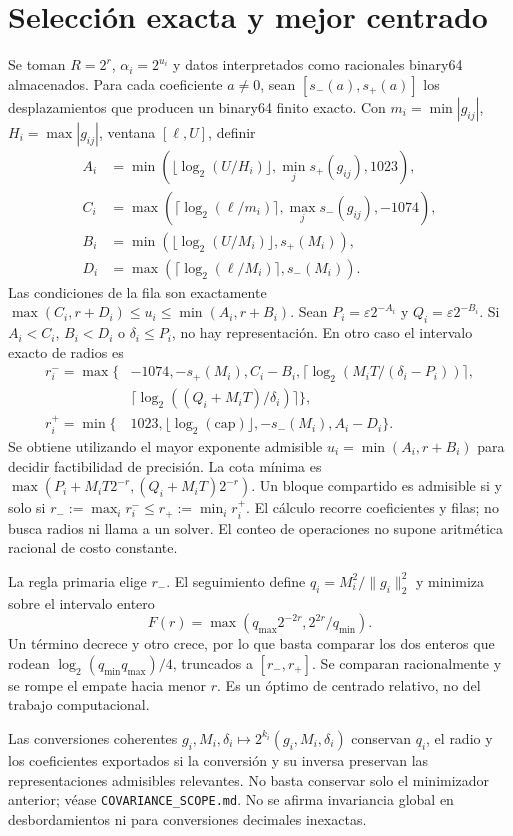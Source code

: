 \documentclass[10pt,a4paper]{article}
\begin{document}
\section{Selección exacta y mejor centrado}
Se toman $R=2^r$, $\alpha_i=2^{u_i}$ y datos interpretados como racionales
binary64 almacenados. Para cada coeficiente $a\ne0$, sean
$[s_-(a),s_+(a)]$ los desplazamientos que producen un binary64 finito exacto.
Con $m_i=\min|g_{ij}|$, $H_i=\max|g_{ij}|$, ventana $[\ell,U]$, definir
\begin{align*}
A_i&=\min(\lfloor\log_2(U/H_i)\rfloor,\min_j s_+(g_{ij}),1023),\\
C_i&=\max(\lceil\log_2(\ell/m_i)\rceil,\max_j s_-(g_{ij}),-1074),\\
B_i&=\min(\lfloor\log_2(U/M_i)\rfloor,s_+(M_i)),\\
D_i&=\max(\lceil\log_2(\ell/M_i)\rceil,s_-(M_i)).
\end{align*}
Las condiciones de la fila son exactamente
$\max(C_i,r+D_i)\le u_i\le\min(A_i,r+B_i)$.
Sean $P_i=\varepsilon2^{-A_i}$ y $Q_i=\varepsilon2^{-B_i}$.
Si $A_i<C_i$, $B_i<D_i$ o $\delta_i\le P_i$, no hay representación.
En otro caso el intervalo exacto de radios es
\begin{align*}
r_i^- =\max\{&-1074,-s_+(M_i),C_i-B_i,
\lceil\log_2(M_iT/(\delta_i-P_i))\rceil,\\
&\lceil\log_2((Q_i+M_iT)/\delta_i)\rceil\},\\
r_i^+ =\min\{&1023,\lfloor\log_2(\mathrm{cap})\rfloor,-s_-(M_i),A_i-D_i\}.
\end{align*}
Se obtiene utilizando el mayor exponente admisible
$u_i=\min(A_i,r+B_i)$ para decidir factibilidad de precisión. La cota mínima
es $\max(P_i+M_iT2^{-r},(Q_i+M_iT)2^{-r})$.
Un bloque compartido es admisible si y solo si
$r_-:=\max_i r_i^-\le r_+:=\min_i r_i^+$.
El cálculo recorre coeficientes y filas; no busca radios ni llama a un solver.
El conteo de operaciones no supone aritmética racional de costo constante.

La regla primaria elige $r_-$. El seguimiento define
$q_i=M_i^2/\|g_i\|_2^2$ y minimiza sobre el intervalo entero
\[
 F(r)=\max(q_{\max}2^{-2r},2^{2r}/q_{\min}).
\]
Un término decrece y otro crece, por lo que basta comparar los dos enteros
que rodean $\log_2(q_{\min}q_{\max})/4$, truncados a $[r_-,r_+]$.
Se comparan racionalmente y se rompe el empate hacia menor $r$.
Es un óptimo de centrado relativo, no del trabajo computacional.

Las conversiones coherentes $g_i,M_i,\delta_i\mapsto2^{k_i}(g_i,M_i,\delta_i)$
conservan $q_i$, el radio y los coeficientes exportados si la conversión y su
inversa preservan las representaciones admisibles relevantes. No basta conservar
solo el minimizador anterior; véase \texttt{COVARIANCE\_SCOPE.md}. No se afirma
invariancia global en desbordamientos ni para conversiones decimales inexactas.
\end{document}
